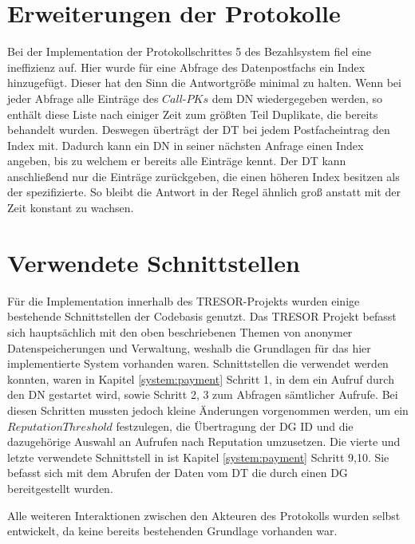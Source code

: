 \documentclass[
	fontsize=11pt,
	headings=small,
	parskip=half,           %
	bibliography=totoc,
	numbers=noenddot,       %
	open=any,               %
]{scrreprt}
\begin{document}
\section{Erweiterungen der Protokolle}
Bei der Implementation der Protokollschrittes 5 des Bezahlsystem fiel eine ineffizienz auf. Hier wurde für eine Abfrage des Datenpostfachs ein Index hinzugefügt. Dieser hat den Sinn die Antwortgröße minimal zu halten. Wenn bei jeder Abfrage alle Einträge des $Call$-$PKs$ dem DN wiedergegeben werden, so enthält diese Liste nach einiger Zeit zum größten Teil Duplikate, die bereits behandelt wurden. Deswegen überträgt der DT bei jedem Postfacheintrag den Index mit. Dadurch kann ein DN in seiner nächsten Anfrage einen Index angeben, bis zu welchem er bereits alle Einträge kennt. Der DT kann anschließend nur die Einträge zurückgeben, die einen höheren Index besitzen als der spezifizierte. So bleibt die Antwort in der Regel ähnlich groß anstatt mit der Zeit konstant zu wachsen.

\section{Verwendete Schnittstellen}
Für die Implementation innerhalb des TRESOR-Projekts wurden einige bestehende Schnittstellen der Codebasis genutzt. Das TRESOR Projekt befasst sich hauptsächlich mit den oben beschriebenen Themen von anonymer Datenspeicherungen und Verwaltung, weshalb die Grundlagen für das hier implementierte System vorhanden waren. Schnittstellen die verwendet werden konnten, waren in Kapitel \ref{system:payment} Schritt 1, in dem ein Aufruf durch den DN gestartet wird, sowie Schritt 2, 3 zum Abfragen sämtlicher Aufrufe. Bei diesen Schritten mussten jedoch kleine Änderungen vorgenommen werden, um ein $ReputationThreshold$ festzulegen, die Übertragung der DG ID und die dazugehörige Auswahl an Aufrufen nach Reputation umzusetzen. Die vierte und letzte verwendete Schnittstell in ist Kapitel \ref{system:payment} Schritt 9,10. Sie befasst sich mit dem Abrufen der Daten vom DT die durch einen DG bereitgestellt wurden. 

Alle weiteren Interaktionen zwischen den Akteuren des Protokolls wurden selbst entwickelt, da keine bereits bestehenden Grundlage vorhanden war. 
\end{document}
